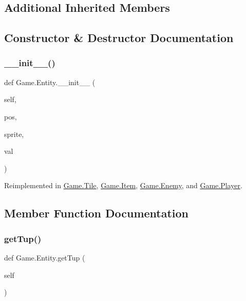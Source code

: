 \subsection*{Additional Inherited Members}


\subsection{Constructor \& Destructor Documentation}
\mbox{\label{class_game_1_1_entity_a1cbc73a05ee02271fa7dca66f3a83ecf}} 
\subsubsection{\texorpdfstring{\_\_init\_\_()}{\_\_init\_\_()}}
{\footnotesize\ttfamily def Game.\+Entity.\+\_\+\+\_\+init\+\_\+\+\_\+ (\begin{DoxyParamCaption}\item[{}]{self,  }\item[{}]{pos,  }\item[{}]{sprite,  }\item[{}]{val }\end{DoxyParamCaption})}



Reimplemented in \mbox{\hyperlink{class_game_1_1_tile_a76fe330c3341ef440fae834f21966f04}{Game.\+Tile}}, \mbox{\hyperlink{class_game_1_1_item_a6b6fa30ae17980fc0287e05504bf5e1d}{Game.\+Item}}, \mbox{\hyperlink{class_game_1_1_enemy_afbad0e6bbc6f5db289990552f81ff848}{Game.\+Enemy}}, and \mbox{\hyperlink{class_game_1_1_player_af39ee9cc682269f7f1c1494b8855a1cb}{Game.\+Player}}.



\subsection{Member Function Documentation}
\mbox{\label{class_game_1_1_entity_a537178139a667fc99904e622f4f40944}} 
\subsubsection{\texorpdfstring{getTup()}{getTup()}}
{\footnotesize\ttfamily def Game.\+Entity.\+get\+Tup (\begin{DoxyParamCaption}\item[{}]{self }\end{DoxyParamCaption})}

